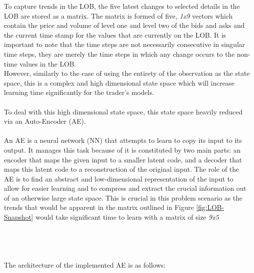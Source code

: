 \documentclass[ %
                    author={Ashwinder Khurana},
                supervisor={Prof Dave Cliff},
                    degree={MEng},
                     title={The Deeply Reinforced Trader},
                  subtitle={},
                      type={enterprise},
                      year={2020} ]{dissertation}
\begin{document}
{\noindent
To capture trends in the LOB, the five latest changes to selected details in the LOB are stored as a matrix. The matrix is formed of five, \textit{1x9} vectors which contain the price and volume of level one and level two of the bids and asks and the current time stamp for the values that are currently on the LOB. It is important to note that the time steps are not necessarily consecutive in singular time steps, they are merely the time steps in which any change occurs to the non-time values in the LOB. 
\\
However, similarly to the case of using the entirety of the observation as the state space, this is a complex and high dimensional state space which will increase learning time significantly for the trader's models.  
\\
\\
To deal with this high dimensional state space, this state space heavily reduced via an Auto-Encoder (AE). 
\\
\\
An AE is a neural network (NN) that attempts to learn to copy its input to its output. It manages this task because of it is constituted by two main parts: an encoder that maps the given input to a smaller latent code, and a decoder that maps this latent code to a reconstruction of the original input. The role of the AE is to find an abstract and low-dimensional representation of the input to allow for easier learning and to compress and extract the crucial information out of an otherwise large state space. This is crucial in this problem scenario as the trends that would be apparent in the matrix outlined in Figure \ref{fig:LOB-Snapshot} would take significant time to learn with a matrix of size \textit{9x5}
\\
\\
\\
\\
\\
The architecture of the implemented AE is as follows:
\begin{figure}[H]
\end{figure}}
\end{document}
